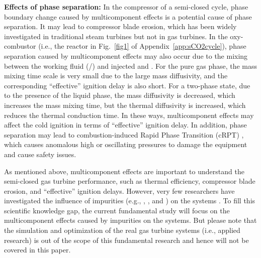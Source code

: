 \textbf{Effects of phase separation:}
In the compressor of a semi-closed  cycle, phase boundary change caused by multicomponent effects is a potential cause of phase separation. It may lead to compressor blade erosion, which has been widely investigated in traditional steam turbines \cite{ahmad2009experimental} but not in  gas turbines. %
In the  oxy-combustor (i.e., the reactor in Fig.~\ref{fig1} of Appendix~\ref{app:sCO2cycle}), phase separation caused by multicomponent effects may also occur due to the mixing between the working fluid (/) and injected  and . For the pure gas phase, the mass mixing time scale is very small due to the large mass diffusivity, and the corresponding ``effective'' ignition delay is also short. For a two-phase state, due to the presence of the liquid phase, the mass diffusivity is decreased, which increases the mass mixing time, but the thermal diffusivity is increased, which reduces the thermal conduction time. In these ways, multicomponent effects may affect the cold ignition in terms of ``effective'' ignition delay. In addition, phase separation may lead to combustion-induced Rapid Phase Transition (cRPT) \citep{basco2013effect}, which causes anomalous high or oscillating pressures to damage the equipment and cause safety issues.

As mentioned above, multicomponent effects are important to understand the semi-closed  gas turbine performance, such as thermal efficiency, compressor blade erosion, and ``effective'' ignition delays. However, very few researchers have investigated the influence of impurities (e.g., , , and ) on the  systems \cite{vesely2019effect,pint2018effect}. 
To fill this scientific knowledge gap, the current fundamental study will focus on the multicomponent effects caused by impurities on the  systems. %
But please note that the simulation and optimization of the real  gas turbine systems (i.e., applied research) is out of the scope of this fundamental research and hence will not be covered in this paper. 

